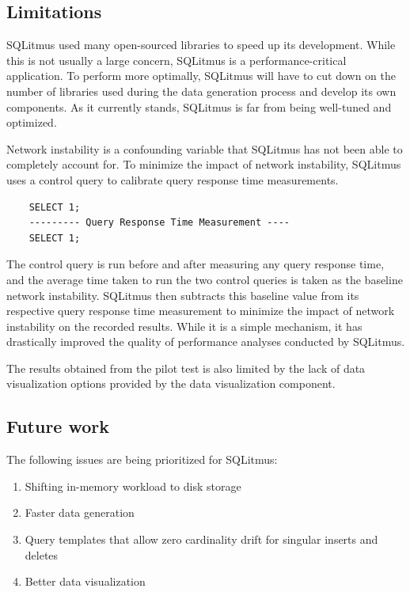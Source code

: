 \documentclass[12pt]{article}
\begin{document}
\begin{spacing}{1.9}
	
	
	\subsection{ Limitations}
	
	SQLitmus used many open-sourced libraries to speed up its development. While this is not usually a large concern, SQLitmus is a performance-critical application. To perform more optimally, SQLitmus will have to cut down on the number of libraries used during the data generation process and develop its own components. As it currently stands, SQLitmus is far from being well-tuned and optimized. 
	
	Network instability is a confounding variable that SQLitmus has not been able to completely account for. To minimize the impact of network instability, SQLitmus uses a control query to calibrate query response time measurements. 
	\begin{verbatim}
	SELECT 1;
	--------- Query Response Time Measurement ----
	SELECT 1;
	\end{verbatim}
	The control query is run before and after measuring any query response time, and the average time taken to run the two control queries is taken as the baseline network instability. SQLitmus then subtracts this baseline value from its respective query response time measurement to minimize the impact of network instability on the recorded results. While it is a simple mechanism, it has drastically improved the quality of performance analyses conducted by SQLitmus.
	
	The results obtained from the pilot test is also limited by the lack of data visualization options provided by the data visualization component.
	
	\subsection{ Future work}
	
	The following issues are being prioritized for SQLitmus:
	\begin{enumerate}
		\item Shifting in-memory workload to disk storage
		\item Faster data generation
		\item Query templates that allow zero cardinality drift for singular inserts and deletes
		\item Better data visualization
	\end{enumerate}
	

\end{spacing}
\end{document}

